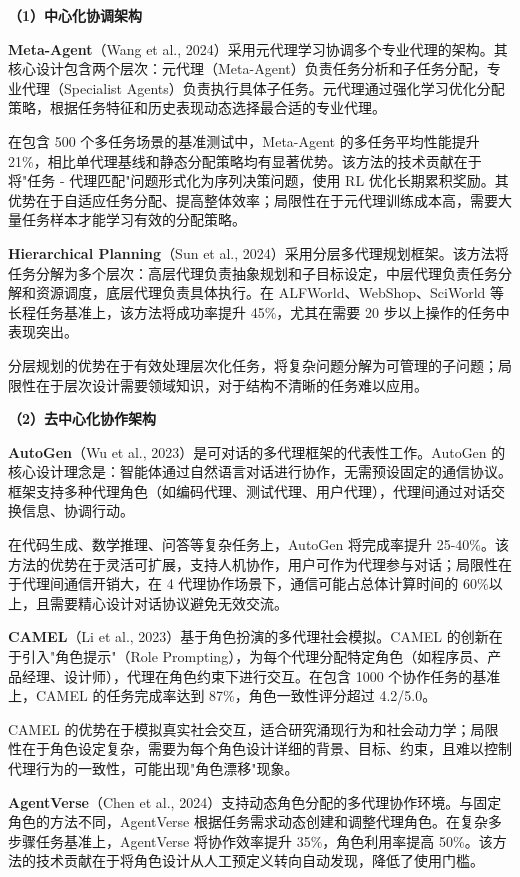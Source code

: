 \documentclass[12pt,a4paper]{article}
\begin{document}
\textbf{（1）中心化协调架构}

\textbf{Meta-Agent}（Wang et al., 2024）采用元代理学习协调多个专业代理的架构。其核心设计包含两个层次：元代理（Meta-Agent）负责任务分析和子任务分配，专业代理（Specialist Agents）负责执行具体子任务。元代理通过强化学习优化分配策略，根据任务特征和历史表现动态选择最合适的专业代理。

在包含 500 个多任务场景的基准测试中，Meta-Agent 的多任务平均性能提升 21\%，相比单代理基线和静态分配策略均有显著优势。该方法的技术贡献在于将"任务 - 代理匹配"问题形式化为序列决策问题，使用 RL 优化长期累积奖励。其优势在于自适应任务分配、提高整体效率；局限性在于元代理训练成本高，需要大量任务样本才能学习有效的分配策略。

\textbf{Hierarchical Planning}（Sun et al., 2024）采用分层多代理规划框架。该方法将任务分解为多个层次：高层代理负责抽象规划和子目标设定，中层代理负责任务分解和资源调度，底层代理负责具体执行。在 ALFWorld、WebShop、SciWorld 等长程任务基准上，该方法将成功率提升 45\%，尤其在需要 20 步以上操作的任务中表现突出。

分层规划的优势在于有效处理层次化任务，将复杂问题分解为可管理的子问题；局限性在于层次设计需要领域知识，对于结构不清晰的任务难以应用。

\textbf{（2）去中心化协作架构}

\textbf{AutoGen}（Wu et al., 2023）是可对话的多代理框架的代表性工作。AutoGen 的核心设计理念是：智能体通过自然语言对话进行协作，无需预设固定的通信协议。框架支持多种代理角色（如编码代理、测试代理、用户代理），代理间通过对话交换信息、协调行动。

在代码生成、数学推理、问答等复杂任务上，AutoGen 将完成率提升 25-40\%。该方法的优势在于灵活可扩展，支持人机协作，用户可作为代理参与对话；局限性在于代理间通信开销大，在 4 代理协作场景下，通信可能占总体计算时间的 60\%以上，且需要精心设计对话协议避免无效交流。

\textbf{CAMEL}（Li et al., 2023）基于角色扮演的多代理社会模拟。CAMEL 的创新在于引入"角色提示"（Role Prompting），为每个代理分配特定角色（如程序员、产品经理、设计师），代理在角色约束下进行交互。在包含 1000 个协作任务的基准上，CAMEL 的任务完成率达到 87\%，角色一致性评分超过 4.2/5.0。

CAMEL 的优势在于模拟真实社会交互，适合研究涌现行为和社会动力学；局限性在于角色设定复杂，需要为每个角色设计详细的背景、目标、约束，且难以控制代理行为的一致性，可能出现"角色漂移"现象。

\textbf{AgentVerse}（Chen et al., 2024）支持动态角色分配的多代理协作环境。与固定角色的方法不同，AgentVerse 根据任务需求动态创建和调整代理角色。在复杂多步骤任务基准上，AgentVerse 将协作效率提升 35\%，角色利用率提高 50\%。该方法的技术贡献在于将角色设计从人工预定义转向自动发现，降低了使用门槛。
\end{document}
